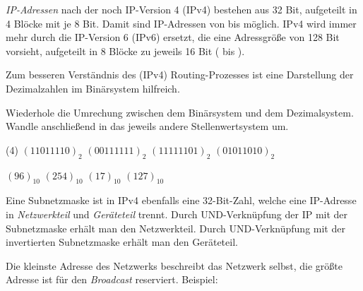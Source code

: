 \documentclass[10pt, a4paper]{arbeitsblatt}
\begin{document}
\ReiheTitel

\emph{IP-Adressen} nach der noch  IP-Version 4 (IPv4) bestehen aus 32 Bit, aufgeteilt in 4 Blöcke mit je 8 Bit. Damit sind IP-Adressen von  bis  möglich. IPv4 wird immer mehr durch die IP-Version 6 (IPv6) ersetzt, die eine Adressgröße von 128 Bit vorsieht, aufgeteilt in 8 Blöcke zu jeweils 16 Bit ( bis ).

Zum besseren Verständnis des (IPv4) Routing-Prozesses ist eine Darstellung der Dezimalzahlen im Binärsystem hilfreich.

\begin{aufgabe}
	Wiederhole die Umrechung zwischen dem Binärsystem und dem Dezimalsystem. Wandle anschließend in das jeweils andere Stellenwertsystem um.

	\begin{tasks}(4)
		\task $(1101 1110)_2$
		\task $(0011 1111)_2$
		\task $(1111 1101)_2$
		\task $(0101 1010)_2$

		\task $(96)_{10}$
		\task $(254)_{10}$
		\task $(17)_{10}$
		\task $(127)_{10}$
	\end{tasks}
\end{aufgabe}

Eine Subnetzmaske ist in IPv4 ebenfalls eine 32-Bit-Zahl, welche eine IP-Adresse in \emph{Netzwerkteil} und \emph{Geräteteil} trennt. Durch UND-Verknüpfung der IP mit der Subnetzmaske erhält man den Netzwerkteil. Durch UND-Verknüpfung mit der invertierten Subnetzmaske erhält man den Geräteteil.

Die kleinste Adresse des Netzwerks beschreibt das Netzwerk selbst, die größte Adresse ist für den \emph{Broadcast} reserviert. Beispiel:
\end{document}
